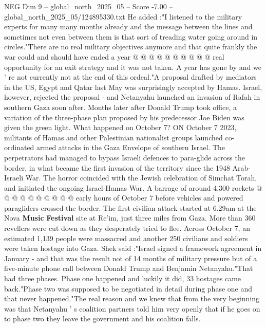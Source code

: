 \begin{textsample}{NEG Dim 9 – global\_north\_2025\_05 – Score -7.00 – global\_north\_2025\_05/124895330.txt}
He added :"I listened to the military experts for many many months already and the message between the lines and sometimes not even between them is that sort of treading water going around in circles."There are no real military objectives anymore and that quite frankly the war could and should have ended a year @ @ @ @ @ @ @ @ @ @ real opportunity for an exit strategy and it was not taken.
A year has gone by and we ' re not currently not at the end of this ordeal."A proposal drafted by mediators in the US, Egypt and Qatar last May was surprisingly accepted by Hamas.
Israel, however, rejected the proposal - and Netanyahu launched an invasion of Rafah in southern Gaza soon after.
Months later after Donald Trump took office, a variation of the three-phase plan proposed by his predecessor Joe Biden was given the green light.
What happened on October 7?
ON October 7 2023, militants of Hamas and other Palestinian nationalist groups launched co-ordinated armed attacks in the Gaza Envelope of southern Israel.
The perpetrators had managed to bypass Israeli defences to para-glide across the border, in what became the first invasion of the territory since the 1948 Arab-Israeli War.
The horror coincided with the Jewish celebration of Simchat Torah, and initiated the ongoing Israel-Hamas War.
A barrage of around 4,300 rockets @ @ @ @ @ @ @ @ @ @ early hours of October 7 before vehicles and powered paragliders crossed the border.
The first civilian attack started at 6.29am at the Nova \textbf{Music} \textbf{Festival} site at Re'im, just three miles from Gaza.
More than 360 revellers were cut down as they desperately tried to flee.
Across October 7, an estimated 1,139 people were massacred and another 250 civilians and soldiers were taken hostage into Gaza.
Shek said :"Israel signed a framework agreement in January - and that was the result not of 14 months of military pressure but of a five-minute phone call between Donald Trump and Benjamin Netanyahu."That had three phases.
Phase one happened and luckily it did, 33 hostages came back."Phase two was supposed to be negotiated in detail during phase one and that never happened."The real reason and we knew that from the very beginning was that Netanyahu ' s coalition partners told him very openly that if he goes on to phase two they leave the government and his coalition falls.

\end{textsample}
